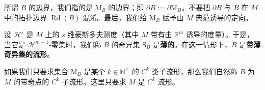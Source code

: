 所谓 $ B $ 的边界，我们指的是 $ \mathrm{M}_B $ 的边界；即 $ \partial B := \partial\mathrm{M}_B $。不要把 $ \partial B $ 与 $ B $ 在 $ M $ 中的拓扑边界 $ \operatorname{Rd}(B) $ 混淆。最后，我们给 $ \mathrm{M}_B $ 赋予由 $ M $ 典范诱导的定向。


设 $ \mathcal{H}^s $ 是 $ M $ 上的 $ s $ 维豪斯多夫测度（其中 $ M $ 带有由 $ \mathbb{R}^m $ 诱导的度量）。于是，当它是 $ \mathcal{H}^{m-1} $-零集时，我们称 $ B $ 的奇异集 $ \mathrm{S}_B $ 是\textbf{薄的}。在这一情形下，$ B $ 是\textbf{带薄奇异集的流形}。

如果我们只要求集合 $ \mathrm{M}_B $ 是某个 $ k \in \mathbb{N}^\times $ 的 $ C^k $ 类子流形，那么我们自然称 $ B $ 为 $ M $ 的带奇点的 $ C^k $ 子流形。这里只要求 $ M $ 是 $ C^k $ 流形。

